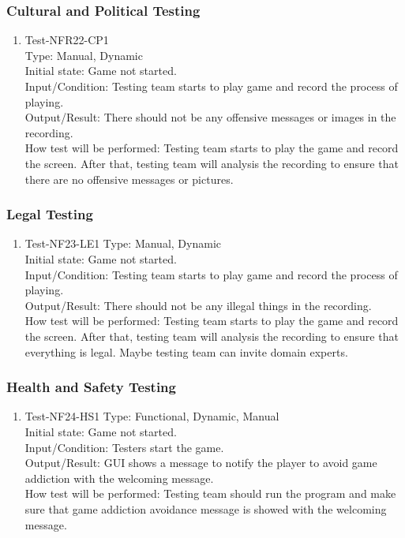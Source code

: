 \documentclass[12pt]{article}
\begin{document}
\subsubsection{Cultural and Political Testing}
\begin{enumerate}[1.]
\item Test-NFR22-CP1\\
Type: Manual, Dynamic\\
Initial state: Game not started.\\
Input/Condition: Testing team starts to play game
and record the process of playing.\\
Output/Result: There should not be any offensive
messages or images in the recording.\\
How test will be performed: Testing team starts to
play the game and record the screen. After that, 
testing team will analysis the recording to ensure
that there are no offensive messages or pictures.
\end{enumerate}
\subsubsection{Legal Testing}
\begin{enumerate}[1.]
\item Test-NF23-LE1
Type: Manual, Dynamic\\
Initial state: Game not started.\\
Input/Condition: Testing team starts to play game
and record the process of playing.\\
Output/Result: There should not be any illegal things in the recording.\\
How test will be performed: Testing team starts to
play the game and record the screen. After that, 
testing team will analysis the recording to ensure
that everything is legal. Maybe testing team can
invite domain experts.
\end{enumerate}
\subsubsection{Health and Safety Testing}
\begin{enumerate}[1.]
\item Test-NF24-HS1
Type: Functional, Dynamic, Manual\\
Initial state: Game not started.\\
Input/Condition: Testers start the game.\\
Output/Result: GUI shows a message to notify the 
player to avoid game addiction with the welcoming 
message.\\
How test will be performed: Testing team should 
run the program and make sure that game addiction
avoidance message is showed with the welcoming message.
\end{enumerate}
\end{document}
